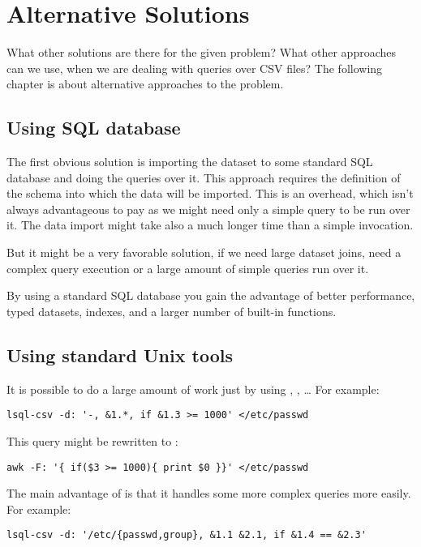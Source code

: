 
\chapter{Alternative Solutions}
What other solutions are there for the given problem? What other approaches can we use, when we are dealing with queries over CSV files? 
The following chapter is about alternative approaches to the problem.

\section{Using SQL database}
The first obvious solution is importing the dataset to some standard SQL database and doing the queries over it. 
This approach requires the definition of the schema into which the data will be imported. This is an overhead, which isn't
always advantageous to pay as we might need only a simple query to be run over it.
The data import might take also a much longer time than a simple  invocation.

But it might be a very favorable solution, if we need large dataset joins, need a complex query execution or a large amount of simple queries run over it.

By using a standard SQL database you gain the advantage of better performance, typed datasets, indexes, and a larger number of built-in functions.

\section{Using standard Unix tools}
It is possible to do a large amount of work just by using , , \ldots{}
For example:

\begin{verbatim}
lsql-csv -d: '-, &1.*, if &1.3 >= 1000' </etc/passwd
\end{verbatim}

This query might be rewritten to :
\begin{verbatim}
awk -F: '{ if($3 >= 1000){ print $0 }}' </etc/passwd
\end{verbatim}

The main advantage of  is that it handles some more complex queries more easily. For example:
\begin{verbatim}
lsql-csv -d: '/etc/{passwd,group}, &1.1 &2.1, if &1.4 == &2.3'
\end{verbatim}

